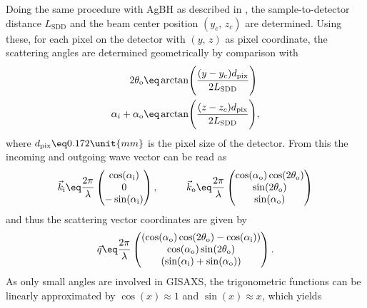 \documentclass[\main/dresen_thesis.tex]{subfiles}
\begin{document}
    Doing the same procedure with AgBH as described in , the sample-to-detector distance $L_\mathrm{SDD}$ and the beam center position $(y_c,\,z_c)$ are determined.
    Using these, for each pixel on the detector with $(y,\,z)$ as pixel coordinate, the scattering angles are determined geometrically by comparison with 
    \begin{align}
      \begin{split}
        2 \theta_\mathrm{o} &\eq \arctan \Biggl( \frac{(y - y_c) d_\mathrm{pix}}{2 L_\mathrm{SDD}} \Biggl)\\
        \alpha_i + \alpha_\mathrm{o} &\eq \arctan \Biggl( \frac{(z - z_c) d_\mathrm{pix}}{2 L_\mathrm{SDD}} \Biggl),
      \end{split}
    \end{align}
    where $d_\mathrm{pix} \eq 0.172 \unit{mm}$ is the pixel size of the detector.
    From this the incoming and outgoing wave vector can be read as
    \begin{align}
      \vec{k}_\mathrm{i} \eq \frac{2 \pi}{\lambda} \begin{pmatrix}
        \cos(\alpha_\mathrm{i})\\
        0\\
        -\sin(\alpha_\mathrm{i})
      \end{pmatrix}, \hspace{1cm}
      \vec{k}_\mathrm{o} \eq \frac{2 \pi}{\lambda} \begin{pmatrix}
        \cos(\alpha_\mathrm{o}) \cos(2\theta_\mathrm{o})\\
        \sin(2\theta_\mathrm{o})\\
        \sin(\alpha_\mathrm{o})
      \end{pmatrix}
    \end{align}
    and thus the scattering vector coordinates are given by
    \begin{align}
      \vec{q} \eq \frac{2 \pi}{\lambda} \begin{pmatrix}
        (\cos(\alpha_\mathrm{o}) \cos(2 \theta_\mathrm{o}) - \cos(\alpha_\mathrm{i}))\\
        \cos(\alpha_\mathrm{o}) \sin(2 \theta_\mathrm{o})\\
        (\sin(\alpha_\mathrm{i}) + \sin(\alpha_\mathrm{o}))
      \end{pmatrix}.
    \end{align}
    As only small angles are involved in GISAXS, the trigonometric functions can be linearly approximated by $\cos(x) \approx 1$ and $\sin(x) \approx x$, which yields
\end{document}

